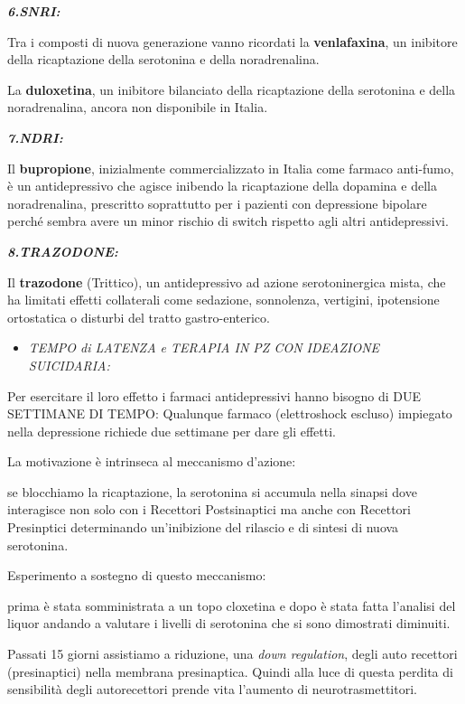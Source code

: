 \documentclass[]{article}
\begin{document}
\textbf{\emph{6.SNRI:}}

Tra i composti di nuova generazione vanno ricordati la
\textbf{venlafaxina}, un inibitore della ricaptazione della serotonina e
della noradrenalina.

La \textbf{duloxetina}, un inibitore bilanciato della ricaptazione della
serotonina e della noradrenalina, ancora non disponibile in Italia.

\textbf{\emph{7.NDRI:}}

Il \textbf{bupropione}, inizialmente commercializzato in Italia come
farmaco anti-fumo, è un antidepressivo che agisce inibendo la
ricaptazione della dopamina e della noradrenalina, prescritto
soprattutto per i pazienti con depressione bipolare perché sembra avere
un minor rischio di switch rispetto agli altri antidepressivi.

\textbf{\emph{8.TRAZODONE:}}

Il \textbf{trazodone} (Trittico), un antidepressivo ad azione
serotoninergica mista, che ha limitati effetti collaterali come
sedazione, sonnolenza, vertigini, ipotensione ortostatica o disturbi del
tratto gastro-enterico.

\begin{itemize}
\item
  \emph{TEMPO di LATENZA e TERAPIA IN PZ CON IDEAZIONE SUICIDARIA:}
\end{itemize}

Per esercitare il loro effetto i farmaci antidepressivi hanno bisogno di
DUE SETTIMANE DI TEMPO: Qualunque farmaco (elettroshock escluso)
impiegato nella depressione richiede due settimane per dare gli effetti.

La motivazione è intrinseca al meccanismo d'azione:

se blocchiamo la ricaptazione, la serotonina si accumula nella sinapsi
dove interagisce non solo con i Recettori Postsinaptici ma anche con
Recettori Presinptici determinando un'inibizione del rilascio e di
sintesi di nuova serotonina.

Esperimento a sostegno di questo meccanismo:

prima è stata somministrata a un topo cloxetina e dopo è stata fatta
l'analisi del liquor andando a valutare i livelli di serotonina che si
sono dimostrati diminuiti.

Passati 15 giorni assistiamo a riduzione, una \emph{down regulation},
degli auto recettori (presinaptici) nella membrana presinaptica. Quindi
alla luce di questa perdita di sensibilità degli autorecettori prende
vita l'aumento di neurotrasmettitori.
\end{document}

